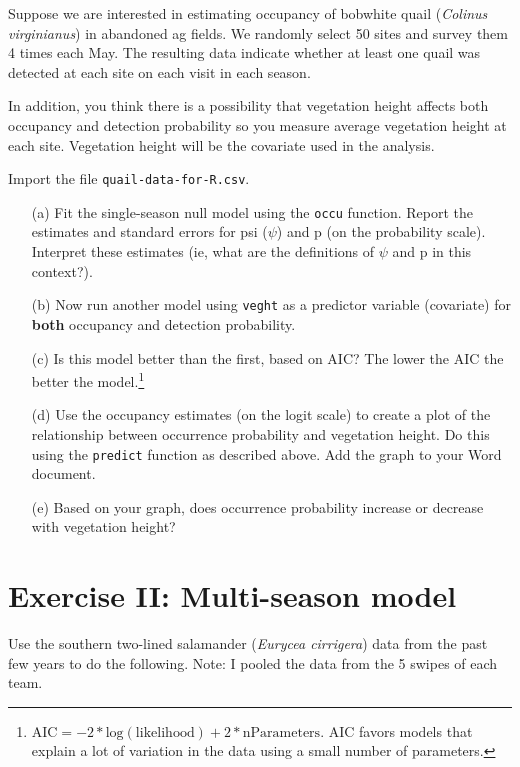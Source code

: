 \documentclass[12pt]{article}\usepackage[]{graphicx}\usepackage[]{color}
\begin{document}
Suppose we are interested in estimating occupancy of bobwhite quail
({\it Colinus virginianus}) in abandoned ag fields. We randomly select
50 sites and survey them 4 times each May. The resulting data indicate
whether at least one quail was detected at each site on each visit in
each season.    

In addition, you think there is a possibility that vegetation height
affects both occupancy and detection probability so you measure
average vegetation height at each site. Vegetation height will be the
covariate used in the analysis. 

Import the file {\tt quail-data-for-R.csv}.

\begin{enumerate}
  \item[(a)] Fit the single-season null model using the \texttt{occu} 
    function. Report the estimates and standard errors for psi
    ($\psi$) and p (on the probability scale). Interpret 
    these estimates (ie, what are the definitions of $\psi$ and p in this
    context?). 
  \item[(b)] Now run another model using \texttt{veght} as a
    predictor variable (covariate) for {\bf both} occupancy and detection
    probability. 
  \item[(c)] Is this model better than the first, based on AIC? The
    lower the AIC the better the model.\footnote{$\mathrm{AIC} =
      -2*\mathrm{log(likelihood)} + 2*\mathrm{nParameters}$. AIC
      favors models that explain a lot of variation in the data using
      a small number of parameters.}  
  \item[(d)] Use the occupancy estimates (on the logit scale) to
    create a plot of the relationship between occurrence probability
    and vegetation height. Do this using the \texttt{predict} function
    as described above. Add the graph to your Word document.
  \item[(e)] Based on your graph, does occurrence probability
    increase or decrease with vegetation height?  
\end{enumerate}

\clearpage

\section*{Exercise II: Multi-season model}

Use the southern two-lined salamander ({\it Eurycea cirrigera})
data from the past few years to do the following. Note: I pooled the
data from the 5 swipes of each team.
\end{document}
